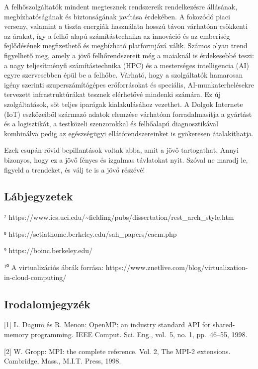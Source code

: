 \documentclass[
]{article}
\begin{document}
A felhőszolgáltatók mindent megtesznek rendszereik rendelkezésre
állásának, megbízhatóságának és biztonságának javítása érdekében. A
fokozódó piaci verseny, valamint a tiszta energiák használata hosszú
távon várhatóan csökkenti az árakat, így a felhő alapú számítástechnika
az innováció és az emberiség fejlődésének megfizethető és megbízható
platformjává válik. Számos olyan trend figyelhető meg, amely a jövő
felhőrendszereit még a maiaknál is érdekesebbé teszi: a nagy
teljesítményű számítástechnika (HPC) és a mesterséges intelligencia (AI)
egyre szervesebben épül be a felhőbe. Várható, hogy a szolgáltatók
hamarosan igény szerinti szuperszámítógépes erőforrásokat és speciális,
AI-munkaterhelésekre tervezett infrastruktúrákat tesznek elérhetővé
mindenki számára. Ez új szolgáltatások, sőt teljes iparágak
kialakulásához vezethet. A Dolgok Internete (IoT) eszközeiből származó
adatok elemzése várhatóan forradalmasítja a gyártást és a logisztikát, a
testközeli szenzorokkal és felhőalapú diagnosztikával kombinálva pedig
az egészségügyi ellátórendszereinket is gyökeresen átalakíthatja.

Ezek csupán rövid bepillantások voltak abba, amit a jövő tartogathat.
Annyi bizonyos, hogy ez a jövő fényes és izgalmas távlatokat nyit.
Szóval ne maradj le, figyeld a trendeket, és válj te is a jövő részévé!

\hypertarget{luxe1bjegyzetek}{%
\subsection{Lábjegyzetek}\label{luxe1bjegyzetek}}

⁷
https://www.ics.uci.edu/\textasciitilde fielding/pubs/dissertation/rest\_arch\_style.htm

⁸ https://setiathome.berkeley.edu/sah\_papers/cacm.php

⁹ https://boinc.berkeley.edu/

¹⁰ A virtualizációs ábrák forrása:
https://www.znetlive.com/blog/virtualization-in-cloud-computing/

\hypertarget{irodalomjegyzuxe9k}{%
\subsection{Irodalomjegyzék}\label{irodalomjegyzuxe9k}}

{[}1{]} L. Dagum és R. Menon: OpenMP: an industry standard API for
shared-memory programming. IEEE Comput. Sci. Eng., vol.~5, no. 1,
pp.~46--55, 1998.

{[}2{]} W. Gropp: MPI: the complete reference. Vol. 2, The MPI-2
extensions. Cambridge, Mass., M.I.T. Press, 1998.
\end{document}
